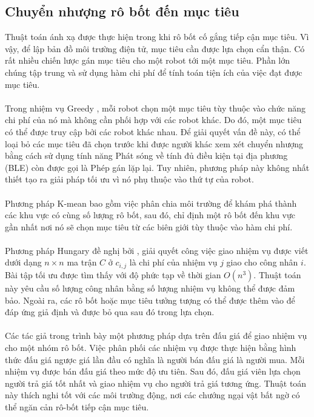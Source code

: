 \documentclass[11pt,openany]{book}
\begin{document}
\subsection{Chuyển nhượng rô bốt đến mục tiêu}
Thuật toán ánh xạ được thực hiện trong khi rô bốt cố gắng tiếp cận mục tiêu. Vì vậy, để lập bản đồ môi trường điện tử, mục tiêu cần được lựa chọn cẩn thận. Có rất nhiều chiến lược gán mục tiêu cho một robot tới một mục tiêu. Phần lớn chúng tập trung và sử dụng hàm chi phí để tính toán tiện ích của việc đạt được mục tiêu.\\\\
Trong nhiệm vụ Greedy \cite{yamauchi1998frontier}, mỗi robot chọn một mục tiêu tùy thuộc vào chức năng chi phí của nó mà không cần phối hợp với các robot khác. Do đó, một mục tiêu có thể được truy cập bởi các robot khác nhau. Để giải quyết vấn đề này, có thể loại bỏ các mục tiêu đã chọn trước khi được người khác xem xét chuyển nhượng bằng cách sử dụng tính năng Phát sóng về tính đủ điều kiện tại địa phương (BLE) \cite{werger2000broadcast} còn được gọi là Phép gán lặp lại. Tuy nhiên, phương pháp này không nhất thiết tạo ra giải pháp tối ưu vì nó phụ thuộc vào thứ tự của robot.\\\\
Phương pháp K-mean \cite{solanas2004coordinated} bao gồm việc phân chia môi trường để khám phá thành các khu vực có cùng số lượng rô bốt, sau đó, chỉ định một rô bốt đến khu vực gần nhất nơi nó sẽ chọn mục tiêu từ các biên giới tùy thuộc vào hàm chi phí.\\\\
Phương pháp Hungary \cite{deb1999multi} đề nghị bởi \cite{kuhn2005hungarian}, giải quyết công việc giao nhiệm vụ được viết dưới dạng $n \times n$ ma trận $C$ ở $c_{i,j}$ là chi phí của nhiệm vụ $j$ giao cho công nhân $i$. Bài tập tối ưu được tìm thấy với độ phức tạp về thời gian $O(n^3)$. Thuật toán này yêu cầu số lượng công nhân bằng số lượng nhiệm vụ không thể được đảm bảo. Ngoài ra, các rô bốt hoặc mục tiêu tưởng tượng có thể được thêm vào để đáp ứng giả định và được bỏ qua sau đó trong lựa chọn.\\\\
Các tác giả trong \cite{nanjanath2006dynamic} trình bày một phương pháp dựa trên đấu giá để giao nhiệm vụ cho một nhóm rô bốt. Việc phân phối các nhiệm vụ được thực hiện bằng hình thức đấu giá ngược giá lần đầu có nghĩa là người bán đấu giá là người mua. Mỗi nhiệm vụ được bán đấu giá theo mức độ ưu tiên. Sau đó, đấu giá viên lựa chọn người trả giá tốt nhất và giao nhiệm vụ cho người trả giá tương ứng. Thuật toán này thích nghi tốt với các môi trường động, nơi các chướng ngại vật bất ngờ có thể ngăn cản rô-bốt tiếp cận mục tiêu.\\\\
\end{document}
